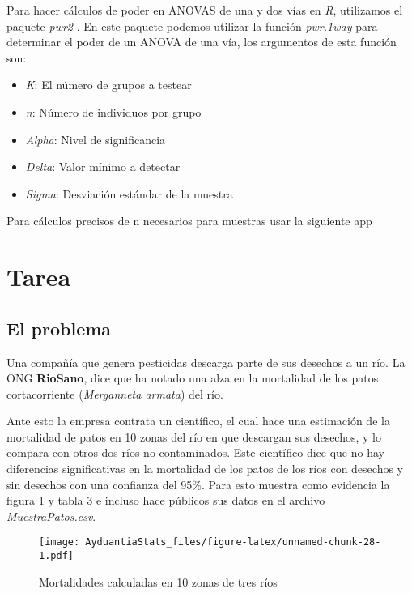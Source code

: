 \documentclass[]{book}
\providecommand{\tightlist}{%
  \setlength{\itemsep}{0pt}\setlength{\parskip}{0pt}}
\begin{document}
Para hacer cálculos de poder en ANOVAS de una y dos vías en \emph{R},
utilizamos el paquete \emph{pwr2} \citep{Pengcheng2017}. En este paquete
podemos utilizar la función \emph{pwr.1way} para determinar el poder de
un ANOVA de una vía, los argumentos de esta función son:

\begin{itemize}
\tightlist
\item
  \emph{K}: El número de grupos a testear
\item
  \emph{n}: Número de individuos por grupo
\item
  \emph{Alpha}: Nivel de significancia
\item
  \emph{Delta}: Valor mínimo a detectar
\item
  \emph{Sigma}: Desviación estándar de la muestra
\end{itemize}

Para cálculos precisos de n necesarios para muestras usar la siguiente
app

\section{Tarea}\label{tarea}

\subsection{El problema}\label{el-problema}

Una compañía que genera pesticidas descarga parte de sus desechos a un
río. La ONG \textbf{RioSano}, dice que ha notado una alza en la
mortalidad de los patos cortacorriente (\emph{Merganneta armata}) del
río.

Ante esto la empresa contrata un científico, el cual hace una estimación
de la mortalidad de patos en 10 zonas del río en que descargan sus
desechos, y lo compara con otros dos ríos no contaminados. Este
científico dice que no hay diferencias significativas en la mortalidad
de los patos de los ríos con desechos y sin desechos con una confianza
del 95\%. Para esto muestra como evidencia la figura 1 y tabla 3 e
incluso hace públicos sus datos en el archivo \emph{MuestraPatos.csv}.

\begin{figure}
\centering
\texttt{[image: AyduantiaStats\_files/figure-latex/unnamed-chunk-28-1.pdf]}
\caption{\label{fig:unnamed-chunk-28}Mortalidades calculadas en 10 zonas de
tres ríos}
\end{figure}
\end{document}
